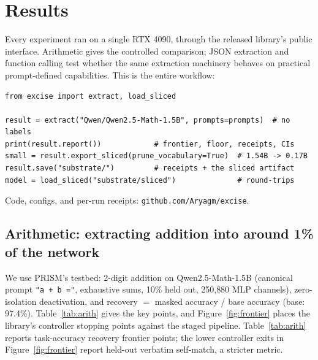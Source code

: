 \documentclass{article}
\begin{document}
\section{Results}\label{sec:results}

Every experiment ran on a single RTX 4090, through the released library's
public interface. Arithmetic gives the controlled comparison; JSON extraction
and function calling test whether the same extraction machinery behaves on
practical prompt-defined capabilities. This is the entire workflow:

\noindent\begin{minipage}{\linewidth}
\begin{lstlisting}[style=py]
from excise import extract, load_sliced

result = extract("Qwen/Qwen2.5-Math-1.5B", prompts=prompts)  # no labels
print(result.report())            # frontier, floor, receipts, CIs
small = result.export_sliced(prune_vocabulary=True)  # 1.54B -> 0.17B
result.save("substrate/")         # receipts + the sliced artifact
model = load_sliced("substrate/sliced")              # round-trips
\end{lstlisting}
\end{minipage}

\noindent Code, configs, and per-run receipts:
\texttt{github.com/Aryagm/excise}.

\subsection{Arithmetic: extracting addition into around 1\% of the network}

We use PRISM's testbed: 2-digit addition on Qwen2.5-Math-1.5B
\citep{qwen25math} (canonical prompt \texttt{"a + b ="}, exhaustive sums, 10\%
held out, 250{,}880 MLP channels), zero-isolation deactivation, and recovery
$=$ masked accuracy / base accuracy (base: 97.4\%). Table~\ref{tab:arith}
gives the key points, and Figure~\ref{fig:frontier} places the library's
controller stopping points against the staged pipeline.
Table~\ref{tab:arith} reports task-accuracy recovery frontier points; the
lower controller exits in Figure~\ref{fig:frontier} report held-out verbatim
self-match, a stricter metric.
\end{document}
